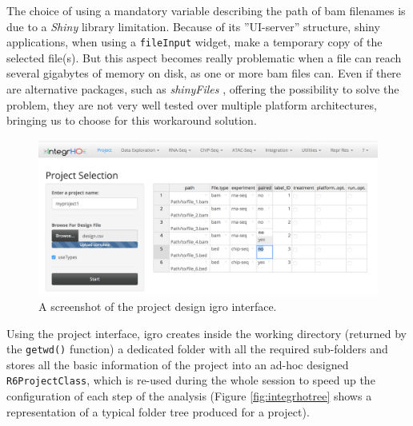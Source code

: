 The choice of using a mandatory variable describing the path of  \gls{bam} filenames is due to a \textit{Shiny} library limitation. 
Because of its ''UI-server'' structure, shiny applications, when using a \lstinline!fileInput! widget, make a temporary copy of the selected file(s).
But this aspect becomes really problematic when a file can reach several gigabytes of memory on disk, as one or more \gls{bam} files can.
Even if there are alternative packages, such as \textit{shinyFiles} \cite{Pedersen}, offering the possibility to solve the problem, they are not very well tested over multiple platform architectures, bringing us to choose for this workaround solution.

\begin{figure}[H]
\centering
\includegraphics[width=\textwidth, keepaspectratio]{img/integrho/design.png}
\caption[\gls{igro} design interface]{A screenshot of the project design \gls{igro} interface.}
\label{fig:integrhodesign}
\end{figure}

Using the project interface, \gls{igro} creates inside the working directory (returned by the \lstinline!getwd()! function) a dedicated folder with all the required sub-folders and stores all the basic information of the project into an ad-hoc designed \lstinline!R6ProjectClass!, which is re-used during the whole session to speed up the configuration of each step of the analysis (Figure \ref{fig:integrhotree} shows a representation of a typical folder tree produced for a project).

